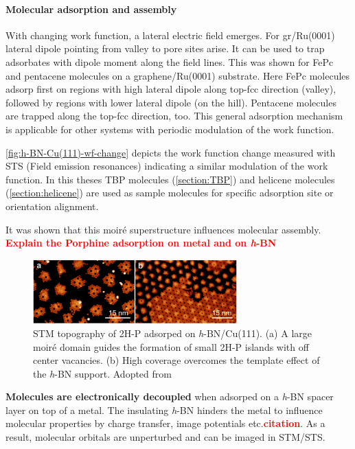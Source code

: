 \paragraph{Molecular adsorption and assembly}
\label{section:Mol-on-h-BN}
With changing work function, a lateral electric field emerges. For gr/Ru(0001) lateral dipole pointing from valley to pore sites arise.\cite{zhang_assembly_2011} It can be used to trap adsorbates with dipole moment along the field lines. This was shown for FePc and pentacene molecules on a graphene/Ru(0001) substrate. Here FePc molecules adsorp first on regions with high lateral dipole along top-fcc direction (valley), followed by regions with lower lateral dipole (on the hill). Pentacene molecules are trapped along the top-fcc direction, too.\cite{zhang_assembly_2011}  This general adsorption mechanism is applicable for other systems with periodic modulation of the work function.

\autoref{fig:h-BN-Cu(111)-wf-change} depicts the work function change measured with STS (Field emission resonances) indicating a similar modulation of the work function. In this theses TBP molecules (\autoref{section:TBP}) and helicene molecules (\autoref{section:helicene}) are used as sample molecules for specific adsorption site or orientation alignment.

It was shown that this moir\'e superstructure influences molecular assembly. 
\textcolor{red}{\textbf{Explain the Porphine adsorption on metal and on \textit{h}-BN}}

\begin{figure} \centering
	\includegraphics[width=0.7\textwidth]{./images/2H-P-hBN-Cu111-joshi}%
	\caption{STM topography of 2H-P adsorped on \textit{h}-BN/Cu(111). (a) A large moir\'e domain guides the formation of small 2H-P islands with off center vacancies. (b) High coverage overcomes the template effect of the \textit{h}-BN support. Adopted from \cite{diss-joshi}}
	\label{fig:2H-P-hBN-Cu111-joshi}
\end{figure}

\textbf{Molecules are electronically decoupled} when adsorped on a \textit{h}-BN spacer layer on top of a metal. The insulating \textit{h}-BN hinders the metal to influence molecular properties by charge transfer, image potentials etc.\textcolor{red}{\textbf{citation}}. As a result, molecular orbitals are unperturbed and can be imaged in STM/STS.
